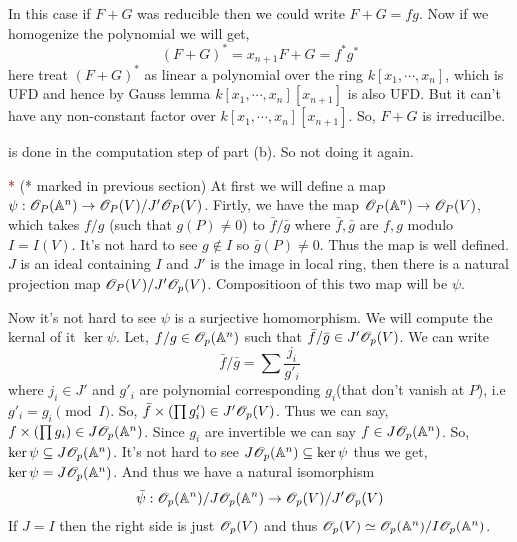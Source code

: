 \documentclass[12pt]{article}
\begin{document}
\vspace*{0.2cm}

\noindent  \textcolor{maroon}{} In this case if $F+G$ was reducible then we could write $F+G = fg$. Now if we homogenize the polynomial we will get, $$(F+G)^{\ast} = x_{n+1}F+G = f^{\ast} g^{\ast}$$ here treat $(F+G)^{\ast}$ as linear a polynomial over the ring $k[x_1,\cdots,x_n]$, which is UFD and hence by Gauss lemma $k[x_1,\cdots,x_n][x_{n+1}]$ is also UFD. But it can't have any non-constant factor over $k[x_1,\cdots,x_n][x_{n+1}]$. So, $F+G$ is irreducilbe. 

\vspace*{0.2cm}

\noindent \textcolor{maroon}{} is done in the computation step of  part (b). So not doing it again.

\vspace*{0.2cm}

\noindent \textcolor{maroon}{*} (* marked in previous section) At first we will define a map $\psi : \mathscr{O}_P(\mathbb{A}^n) \to \mathscr{O}_P(V)/J'\mathscr{O}_P(V)$. Firtly, we have the map $\mathscr{O}_P(\mathbb{A}^n) \to \mathscr{O}_P(V)$, which takes $f/g$ (such that $g(P)\neq 0$) to $\bar{f}/\bar{g}$ where $\bar{f},\bar{g}$ are $f,g$ modulo $I = I(V)$. It's not hard to see $g \notin I$ so $\bar{g}(P)\neq0$. Thus the map is well defined. $J$ is an ideal containing $I$ and $J'$ is the image in local ring, then there is a natural projection map $\mathscr{O}_P(V)/J'\mathscr{O}_p(V)$. Compositioon of this two map will be $\psi$.

\vspace*{0.2cm}

Now it's not hard to see $\psi$ is a surjective homomorphism. We will compute the kernal of it $\ker \psi$. Let, $f/g \in \mathscr{O}_p(\mathbb{A}^n)$ such that $\bar{f}/\bar{g} \in J'\mathscr{O}_p(V)$. We can write $$\bar{f}/\bar{g} = \sum \frac{j_i}{g'_i}$$ where $j_i \in J'$ and $g'_i$ are polynomial corresponding $g_i$(that don't vanish at $P$), i.e $g'_i =g_i \pmod{I}$. So, $\bar{f} \times \qty(\prod g'_i) \in J'\mathscr{O}_p(V)$. Thus we can say, $f \times \qty(\prod g_i) \in J\mathscr{O}_p(\mathbb{A}^n)$. Since $g_i$ are invertible we can say $f \in J\mathscr{O}_p(\mathbb{A}^n)$. So, $\ker \psi \subseteq J\mathscr{O}_p(\mathbb{A}^n)$. It's not hard to see $J\mathscr{O}_p(\mathbb{A}^n) \subseteq \ker \psi$ thus we get, $\ker \psi = J\mathscr{O}_p(\mathbb{A}^n)$. And thus we have a natural isomorphism $$\bar{\psi}: \mathscr{O}_p(\mathbb{A}^n)/J\mathscr{O}_p(\mathbb{A}^n) \to \mathscr{O}_p(V)/J'\mathscr{O}_p(V)$$  If $J=I$ then the right side is just $\mathscr{O}_p(V)$ and thus $\mathscr{O}_p(V)\simeq \mathscr{O}_p(\mathbb{A}^n)/I\mathscr{O}_p(\mathbb{A}^n)$.
\end{document}
